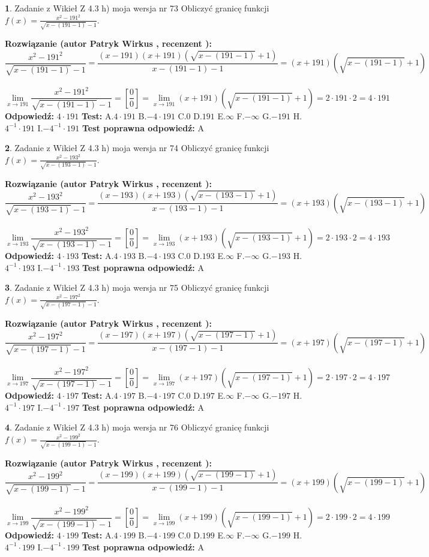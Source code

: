 \documentclass[12pt, a4paper]{article}
\theoremstyle{definition} %
\newtheorem{zad}{}
\newcommand{\zadStart}[1]{\begin{zad}#1\newline}
\newcommand{\zadStop}{\end{zad}}
\newcommand{\rozwStart}[2]{\noindent \textbf{Rozwiązanie (autor #1 , recenzent #2): }\newline}
\newcommand{\rozwStop}{\newline}
\newcommand{\odpStart}{\noindent \textbf{Odpowiedź:}\newline}
\newcommand{\odpStop}{\newline}
\newcommand{\testStart}{\noindent \textbf{Test:}\newline}
\newcommand{\testStop}{\newline}
\newcommand{\kluczStart}{\noindent \textbf{Test poprawna odpowiedź:}\newline}
\newcommand{\kluczStop}{\newline}
\begin{document}
\zadStart{Zadanie z Wikieł Z 4.3 h) moja wersja nr 73}
Obliczyć granicę funkcji $f(x)=\frac{x^{2} - 191^{2}}{\sqrt{x-(191-1)}-1}$.
\zadStop
\rozwStart{Patryk Wirkus}{}
$$\frac{x^{2} - 191^{2}}{\sqrt{x-(191-1)}-1}=\frac{(x-191)(x+191)(\sqrt{x-(191-1)}+1)}{x-(191-1)-1}=(x+191)(\sqrt{x-(191-1)}+1)$$
\\
$$\lim\limits_{x\to 191}\frac{x^{2} - 191^{2}}{\sqrt{x-(191-1)}-1}=[\frac{0}{0}]=
\lim\limits_{x\to 191}(x+191)(\sqrt{x-(191-1)}+1) = 2\cdot191 \cdot 2 = 4 \cdot 191$$
\rozwStop
\odpStart
$4\cdot191$
\odpStop
\testStart
A.$4\cdot191$
B.$-4\cdot191$
C.$0$
D.$191$
E.$\infty$
F.$-\infty$
G.$-191$
H.$4^{-1}\cdot191$
I.$-4^{-1}\cdot191$
\testStop
\kluczStart
A
\kluczStop



\zadStart{Zadanie z Wikieł Z 4.3 h) moja wersja nr 74}
Obliczyć granicę funkcji $f(x)=\frac{x^{2} - 193^{2}}{\sqrt{x-(193-1)}-1}$.
\zadStop
\rozwStart{Patryk Wirkus}{}
$$\frac{x^{2} - 193^{2}}{\sqrt{x-(193-1)}-1}=\frac{(x-193)(x+193)(\sqrt{x-(193-1)}+1)}{x-(193-1)-1}=(x+193)(\sqrt{x-(193-1)}+1)$$
\\
$$\lim\limits_{x\to 193}\frac{x^{2} - 193^{2}}{\sqrt{x-(193-1)}-1}=[\frac{0}{0}]=
\lim\limits_{x\to 193}(x+193)(\sqrt{x-(193-1)}+1) = 2\cdot193 \cdot 2 = 4 \cdot 193$$
\rozwStop
\odpStart
$4\cdot193$
\odpStop
\testStart
A.$4\cdot193$
B.$-4\cdot193$
C.$0$
D.$193$
E.$\infty$
F.$-\infty$
G.$-193$
H.$4^{-1}\cdot193$
I.$-4^{-1}\cdot193$
\testStop
\kluczStart
A
\kluczStop



\zadStart{Zadanie z Wikieł Z 4.3 h) moja wersja nr 75}
Obliczyć granicę funkcji $f(x)=\frac{x^{2} - 197^{2}}{\sqrt{x-(197-1)}-1}$.
\zadStop
\rozwStart{Patryk Wirkus}{}
$$\frac{x^{2} - 197^{2}}{\sqrt{x-(197-1)}-1}=\frac{(x-197)(x+197)(\sqrt{x-(197-1)}+1)}{x-(197-1)-1}=(x+197)(\sqrt{x-(197-1)}+1)$$
\\
$$\lim\limits_{x\to 197}\frac{x^{2} - 197^{2}}{\sqrt{x-(197-1)}-1}=[\frac{0}{0}]=
\lim\limits_{x\to 197}(x+197)(\sqrt{x-(197-1)}+1) = 2\cdot197 \cdot 2 = 4 \cdot 197$$
\rozwStop
\odpStart
$4\cdot197$
\odpStop
\testStart
A.$4\cdot197$
B.$-4\cdot197$
C.$0$
D.$197$
E.$\infty$
F.$-\infty$
G.$-197$
H.$4^{-1}\cdot197$
I.$-4^{-1}\cdot197$
\testStop
\kluczStart
A
\kluczStop



\zadStart{Zadanie z Wikieł Z 4.3 h) moja wersja nr 76}
Obliczyć granicę funkcji $f(x)=\frac{x^{2} - 199^{2}}{\sqrt{x-(199-1)}-1}$.
\zadStop
\rozwStart{Patryk Wirkus}{}
$$\frac{x^{2} - 199^{2}}{\sqrt{x-(199-1)}-1}=\frac{(x-199)(x+199)(\sqrt{x-(199-1)}+1)}{x-(199-1)-1}=(x+199)(\sqrt{x-(199-1)}+1)$$
\\
$$\lim\limits_{x\to 199}\frac{x^{2} - 199^{2}}{\sqrt{x-(199-1)}-1}=[\frac{0}{0}]=
\lim\limits_{x\to 199}(x+199)(\sqrt{x-(199-1)}+1) = 2\cdot199 \cdot 2 = 4 \cdot 199$$
\rozwStop
\odpStart
$4\cdot199$
\odpStop
\testStart
A.$4\cdot199$
B.$-4\cdot199$
C.$0$
D.$199$
E.$\infty$
F.$-\infty$
G.$-199$
H.$4^{-1}\cdot199$
I.$-4^{-1}\cdot199$
\testStop
\kluczStart
A
\kluczStop
\end{document}
